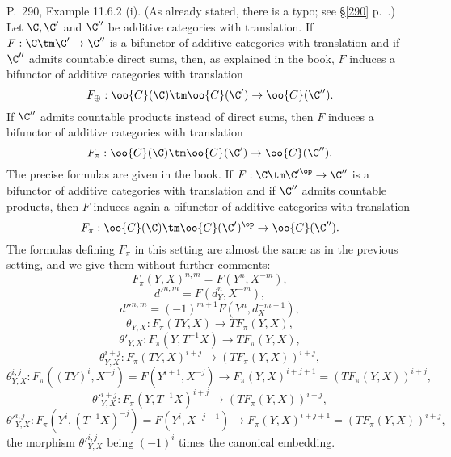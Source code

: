 \documentclass[12pt]{article}
\theoremstyle{remark}
\theoremstyle{definition}
\begin{document}
%

\begin{s}%
P.~290, Example 11.6.2 (i). (As already stated, there is a typo; see \S\ref{290} p.~.) Let $\C,\C'$ and $\C''$ be additive categories with translation. If $F:\C\tm\C'\to\C''$ is a bifunctor of additive categories with translation and if $\C''$ admits countable direct sums, then, as explained in the book, $F$ induces a bifunctor of additive categories with translation 
$$
F_\oplus:\oo{C}(\C)\tm\oo{C}(\C')\to\oo{C}(\C'').
$$ 
If $\C''$ admits countable products instead of direct sums, then $F$ induces a bifunctor of additive categories with translation 
$$
F_\pi:\oo{C}(\C)\tm\oo{C}(\C')\to\oo{C}(\C'').
$$ 
The precise formulas are given in the book. If $F:\C\tm\C'^\op\to\C''$ is a bifunctor of additive categories with translation and if $\C''$ admits countable products, then $F$ induces again a bifunctor of additive categories with translation 
$$
F_\pi:\oo{C}(\C)\tm\oo{C}(\C')^{\op}\to\oo{C}(\C'').
$$ 
The formulas defining $F_\pi$ in this setting are almost the same as in the previous setting, and we give them without further comments:
$$
F_\pi(Y,X)^{n,m}=F(Y^n,X^{-m}),
$$
$$
d'^{n,m}=F(d_Y^n,X^{-m}),
$$
$$
d''^{n,m}=(-1)^{m+1}F(Y^n,d_X^{-m-1}),
$$
$$
\theta_{Y,X}:F_\pi(TY,X)\to TF_\pi(Y,X),
$$
$$
\theta'_{Y,X}:F_\pi(Y,T^{-1}X)\to TF_\pi(Y,X),
$$
$$
\theta_{Y,X}^{i+j}:F_\pi(TY,X)^{i+j}\to(TF_\pi(Y,X))^{i+j},
$$
$$
\theta_{Y,X}^{i,j}:F_\pi((TY)^i,X^{-j})=F(Y^{i+1},X^{-j})\to F_\pi(Y,X)^{i+j+1}=(TF_\pi(Y,X))^{i+j},
$$
$$
{\theta'}_{Y,X}^{i+j}:F_\pi(Y,T^{-1}X)^{i+j}\to(TF_\pi(Y,X))^{i+j},
$$
$$
{\theta'}_{Y,X}^{i,j}:F_\pi(Y^i,(T^{-1}X)^{-j})=F(Y^i,X^{-j-1})\to F_\pi(Y,X)^{i+j+1}=(TF_\pi(Y,X))^{i+j},
$$
the morphism ${\theta'}_{Y,X}^{i,j}$ being $(-1)^i$ times the canonical embedding. 
\end{s}

%
\end{document}
